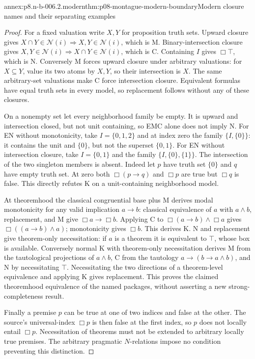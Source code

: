 \begin{annexitem}{annex:p8.n-b-006.2.modern}{thm:p08-montague-modern-boundary}{Modern closure names and their separating examples}
\begin{proof}
For a fixed valuation write \(X,Y\) for proposition truth sets.
Upward closure gives \(X\cap Y\in\mathcal N(i)\Rightarrow
X,Y\in\mathcal N(i)\), which is M. Binary-intersection closure
gives \(X,Y\in\mathcal N(i)\Rightarrow X\cap Y\in\mathcal N(i)\),
which is C. Containing \(I\) gives \(\Box\top\), which is N.
Conversely M forces upward closure under arbitrary valuations: for
\(X\subseteq Y\), value its two atoms by \(X,Y\), so their
intersection is \(X\). The same arbitrary-set valuations make C
force intersection closure. Equivalent formulas have equal truth sets
in every model, so replacement follows without any of these closures.

On a nonempty set let every neighborhood family be empty. It is upward
and intersection closed, but not unit containing, so EMC alone does
not imply N. For EN without monotonicity, take
\(I=\{0,1,2\}\) and at index zero the family
\(\{I,\{0\}\}\): it contains the unit and \(\{0\}\), but not
the superset \(\{0,1\}\). For EN without intersection closure,
take \(I=\{0,1\}\) and the family
\(\{I,\{0\},\{1\}\}\). The intersection of the two singleton
members is absent. Indeed let \(p\) have truth set \(\{0\}\) and
\(q\) have empty truth set. At zero both \(\Box(p\to q)\) and
\(\Box p\) are true but \(\Box q\) is false. This directly
refutes K on a unit-containing neighborhood model.

At theoremhood the classical congruential base plus M derives modal
monotonicity for any valid implication \(a\to b\): classical
equivalence of \(a\) with \(a\land b\), replacement, and M give
\(\Box a\to\Box b\). Applying C to
\(\Box(a\to b)\land\Box a\) gives
\(\Box((a\to b)\land a)\); monotonicity gives \(\Box b\).
This derives K. N and replacement give theorem-only necessitation:
if \(a\) is a theorem it is equivalent to \(\top\), whose box is
available. Conversely normal K with theorem-only necessitation derives
M from the tautological projections of \(a\land b\), C from the
tautology \(a\to(b\to a\land b)\), and N by necessitating
\(\top\). Necessitating the two directions of a theorem-level
equivalence and applying K gives replacement. This proves the claimed
theoremhood equivalence of the named packages, without asserting a
new strong-completeness result.

Finally a premise \(p\) can be true at one of two indices and false
at the other. The source's universal-index \(\Box p\) is then false
at the first index, so \(p\) does not locally entail \(\Box p\).
Necessitation of theorems must not be extended to arbitrary locally
true premises. The arbitrary pragmatic \(N\)-relations impose no
condition preventing this distinction.
\end{proof}
\end{annexitem}
